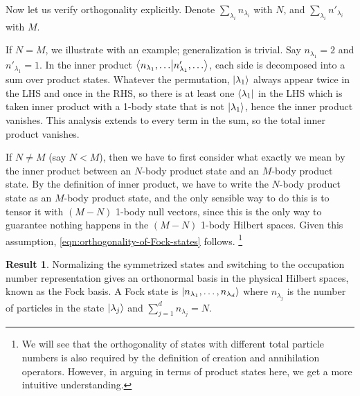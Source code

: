 \documentclass{article}
\theoremstyle{definition}
\newtheorem{res}[mot]{Result}
\numberwithin{equation}{section}
\begin{document}
    Now let us verify orthogonality explicitly. 
    Denote $\sum_{\lambda_{i}}n_{\lambda_{i}}$ with $N$, and
    $\sum_{\lambda_{i}}n'_{\lambda_{i}}$ with $M$.

    If $N=M$, we illustrate with an example; 
    generalization is trivial. Say 
    $n_{\lambda_{1}}=2$ and $n'_{\lambda_{1}}=1$. 
    In the inner product $\bra{n_{\lambda_{1}}, \ldots }\ket{n'_{\lambda_{1}}, \ldots }$, each side is decomposed into a sum over product states. 
    Whatever the permutation, $\ket{\lambda_1}$ always appear 
    twice in the LHS and once in the RHS, so there is at least 
    one $\bra{\lambda_{1}}$ in the LHS which is taken inner product with 
    a 1-body state that is not $\ket{\lambda_{1}}$, hence 
    the inner product vanishes. 
    This analysis extends to every term in the sum, 
    so the total inner product vanishes.

    If $N \neq M$ (say $N<M$), then we have to first consider 
    what exactly we mean by the inner product between 
    an $N$-body product state and an $M$-body product state. 
    By the definition of inner product, 
    we have to write the $N$-body product state 
    as an $M$-body product state, and the only sensible way 
    to do this is to tensor it with $(M-N)$ 1-body null vectors, 
    since this is the only way to guarantee nothing happens 
    in the $(M-N)$ 1-body Hilbert spaces. 
    Given this assumption, 
    \cref{eqn:orthogonality-of-Fock-states} follows. 
    \footnote{
        We will see that the orthogonality of states 
        with different total particle numbers 
        is also required by the definition of 
        creation and annihilation operators. 
        However, in arguing in terms of product states here, 
        we get a more intuitive understanding. 
    }


    \begin{graybox}
    \begin{res}
        Normalizing the symmetrized states and 
        switching to the occupation number representation 
        gives an orthonormal basis in the physical Hilbert spaces, 
        known as the Fock basis. A Fock state is 
        $\ket{n_{\lambda_{1}}, \ldots ,n_{\lambda_{d}}}$ 
        where $n_{\lambda_{j}}$ is the number of particles 
        in the state $\ket{\lambda_{j}}$ and 
        $\sum_{j=1}^{d}n_{\lambda_{j}}=N$.
    \end{res}
    \end{graybox}
\end{document}
